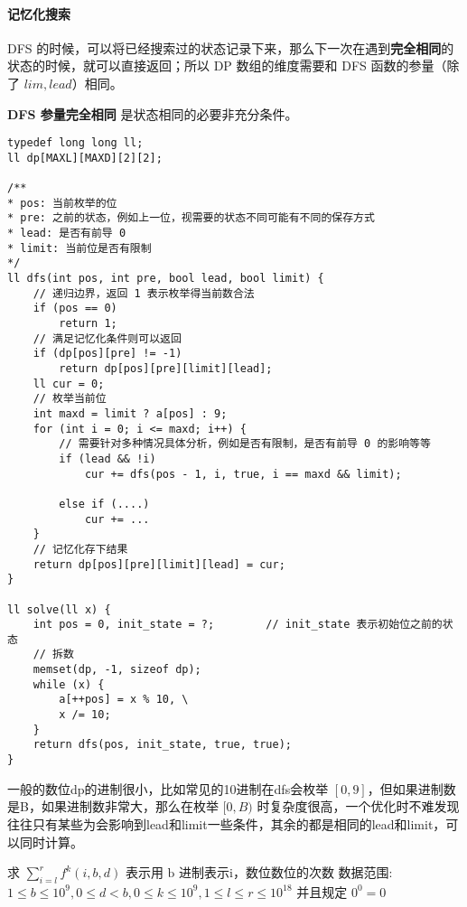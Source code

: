 \paragraph{记忆化搜索}DFS 的时候，可以将已经搜索过的状态记录下来，那么下一次在遇到\textbf{完全相同}的状态的时候，就可以直接返回；所以 DP 数组的维度需要和 DFS 函数的参量（除了 $lim, lead$）相同。

\par \textbf{DFS 参量完全相同} 是状态相同的必要非充分条件。

\begin{verbatim}
typedef long long ll;
ll dp[MAXL][MAXD][2][2];

/**
* pos: 当前枚举的位
* pre: 之前的状态，例如上一位，视需要的状态不同可能有不同的保存方式
* lead: 是否有前导 0
* limit: 当前位是否有限制
*/
ll dfs(int pos, int pre, bool lead, bool limit) {
    // 递归边界，返回 1 表示枚举得当前数合法
    if (pos == 0)
        return 1;
    // 满足记忆化条件则可以返回
    if (dp[pos][pre] != -1)
        return dp[pos][pre][limit][lead];
    ll cur = 0;
    // 枚举当前位
    int maxd = limit ? a[pos] : 9;
    for (int i = 0; i <= maxd; i++) {
        // 需要针对多种情况具体分析，例如是否有限制，是否有前导 0 的影响等等
        if (lead && !i)
            cur += dfs(pos - 1, i, true, i == maxd && limit);

        else if (....)
            cur += ...
    }
    // 记忆化存下结果
    return dp[pos][pre][limit][lead] = cur;
}

ll solve(ll x) {
    int pos = 0, init_state = ?;        // init_state 表示初始位之前的状态
    // 拆数
    memset(dp, -1, sizeof dp);
    while (x) {
        a[++pos] = x % 10, \
        x /= 10;
    }
    return dfs(pos, init_state, true, true);
}
\end{verbatim}

\par \noindent 一般的数位dp的进制很小，比如常见的10进制在dfs会枚举 $[0,9]$，但如果进制数是B，如果进制数非常大，那么在枚举 $[0, B)$ 时复杂度很高，一个优化时不难发现往往只有某些为会影响到lead和limit一些条件，其余的都是相同的lead和limit，可以同时计算。
\begin{tcolorbox}
\par \noindent 求 $\sum_{i=l}^r f^k(i, b, d)$ 表示用 $\mathrm{b}$ 进制表示i，数位数位的次数 数据范围: $1 \leq b \leq 10^9, 0 \leq d<b, 0 \leq k \leq 10^9, 1 \leq l \leq r \leq 10^{18}$ 并且规定 $0^0=0$
\end{tcolorbox}

